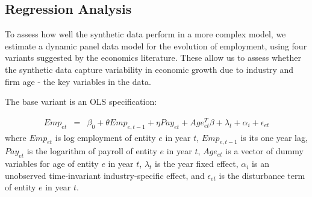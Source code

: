 






\subsection{Regression Analysis}

To assess how well the synthetic data perform in a more complex model, we estimate a dynamic panel data model for the evolution of employment, using four variants suggested by the economics literature. 
These allow us to assess whether the synthetic data capture variability in economic growth due to industry and firm age - the key variables in the data. 

The base variant is an OLS specification:

\begin{eqnarray}	
\label{eq:OLS}
Emp_{et} & = & \beta_0 + \theta Emp_{e,t-1} + \eta Pay_{et} + Age_{et}^{T}\beta + \lambda_t + \alpha_i + \epsilon_{et}
\end{eqnarray}
where $Emp_{et}$ is log employment of entity $e$ in year $t$, $Emp_{e,t-1}$ is its one year lag, $Pay_{et}$ is the logarithm of payroll of entity $e$ in year $t$, $Age_{et}$ is a vector of dummy variables for age of entity $e$ in year $t$, $\lambda_t$ is the year fixed effect, $\alpha_i$ is an unobserved time-invariant industry-specific effect, and $\epsilon_{et}$ is the disturbance term of entity $e$ in year $t$. 


